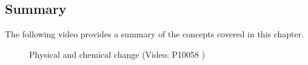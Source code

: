             \subsection{ Summary}
            \nopagebreak
\label{m38711*id972312}
The following video provides a summary of the concepts covered in this chapter.
    \setcounter{subfigure}{0}
	\begin{figure}[H] %
    \textnormal{Physical and chemical change}\vspace{.1in} \nopagebreak
  \label{m38711*yt-media1}\label{m38711*yt-video1}
             { (Video:  P10058 )}
      \vspace{2pt}
    \vspace{.1in}
 \end{figure}       
\par 
